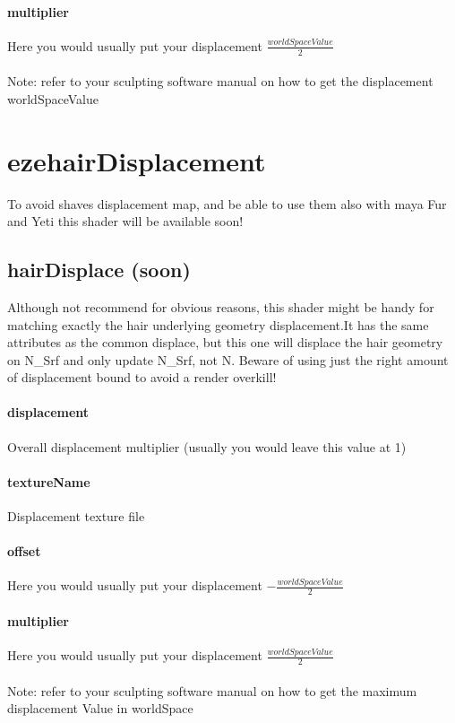 \documentclass[final,letterpaper,twoside,12pt]{report}
\begin{document}
\subsubsection {multiplier}
Here you would usually put your displacement $\frac{worldSpaceValue}{2}$
\smallskip
\\
\\
Note: refer to your sculpting software manual on how to get the displacement worldSpaceValue


\chapter{ezehairDisplacement}

To avoid shaves displacement map, and be able to use them also with maya Fur and Yeti this shader will be available soon!

\section {hairDisplace (soon)}

Although not recommend for obvious reasons, this shader might be handy for matching exactly the hair underlying geometry displacement.It has the same attributes as the common displace, but this one will displace the hair geometry on N\_Srf and only update N\_Srf, not N.
Beware of using just the right amount of displacement bound to avoid a render overkill!

\subsubsection {displacement}
Overall displacement multiplier (usually you would leave this value at 1)
\smallskip
\subsubsection {textureName}
Displacement texture file
\smallskip
\subsubsection {offset}
Here you would usually put your displacement $-\frac{worldSpaceValue}{2}$
\smallskip
\subsubsection {multiplier}
Here you would usually put your displacement $\frac{worldSpaceValue}{2}$
\smallskip
\\
\\
Note: refer to your sculpting software manual on how to get the maximum displacement Value in worldSpace 
\end{document}
